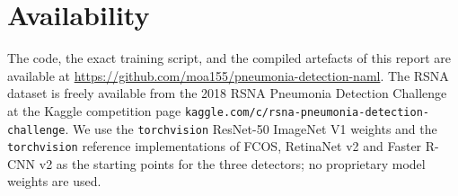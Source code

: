 \documentclass[11pt,a4paper]{article}
\begin{document}
\section*{Availability}
\label{sec:availability}

The code, the exact training script, and the compiled artefacts of this report are available at \url{https://github.com/moa155/pneumonia-detection-naml}. The RSNA dataset is freely available from the 2018 RSNA Pneumonia Detection Challenge at the Kaggle competition page \texttt{kaggle.\allowbreak com/c/\allowbreak rsna-\allowbreak pneumonia-\allowbreak detection-\allowbreak challenge}. We use the \texttt{torchvision} ResNet-50 ImageNet V1 weights and the \texttt{torchvision} reference implementations of FCOS, RetinaNet v2 and Faster R-CNN v2 as the starting points for the three detectors; no proprietary model weights are used.

\pagebreak


\end{document}
